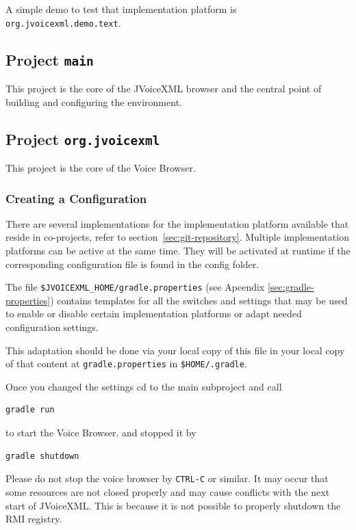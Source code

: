 \documentclass[11pt,a4paper]{article}
\begin{document}
A simple demo to test that implementation platform is
\lstinline{org.jvoicexml.demo.text}.

\subsection{Project \texttt{main}}

This project is the core of the JVoiceXML browser and the central point of
building and configuring the environment.

\subsection{Project \texttt{org.jvoicexml}}

This project is the core of the Voice Browser.

\subsubsection{Creating a Configuration}
\label{sec:create-configuration}

There are several implementations for the implementation platform available
that reside in co-projects, refer to section~\ref{sec:git-repository}. Multiple
implementation platforms can be active at the same time. They will be activated at runtime
if the corresponding configuration file is found in the config folder.

The file \texttt{\$JVOICEXML\_HOME/gradle.properties} (see Apeendix \ref{sec:gradle-properties}) 
contains templates for all
the switches and settings that may be used to enable or disable certain
implementation platforms or adapt needed configuration settings.

This adaptation should be done via your local copy of this file in your
local copy of that content at \texttt{gradle.properties} in
\texttt{\$HOME/.gradle}.

Once you changed the settings cd to the main subproject and call
\begin{lstlisting}
gradle run
\end{lstlisting}
to start the Voice Browser.
and stopped it by
\begin{lstlisting}
gradle shutdown
\end{lstlisting}

Please do not stop the voice browser by \texttt{CTRL-C} or similar. It may occur
that some resources are not closed properly and may cause conflicts with the next
start of JVoiceXML. This is because it is not possible to properly shutdown the
RMI registry.
\end{document}
